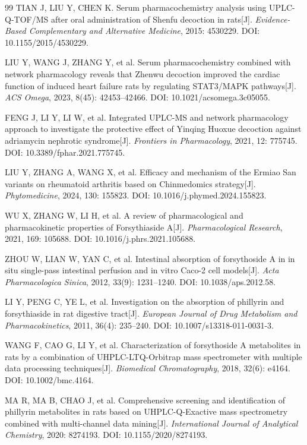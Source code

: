 \documentclass[12pt,a4paper,UTF8,scheme=chinese]{ctexart}
\begin{document}
\begin{thebibliography}{99}
TIAN J, LIU Y, CHEN K. Serum pharmacochemistry analysis using UPLC-Q-TOF/MS after oral administration of Shenfu decoction in rats[J]. \textit{Evidence-Based Complementary and Alternative Medicine}, 2015: 4530229. DOI: 10.1155/2015/4530229.

LIU Y, WANG J, ZHANG Y, et al. Serum pharmacochemistry combined with network pharmacology reveals that Zhenwu decoction improved the cardiac function of induced heart failure rats by regulating STAT3/MAPK pathways[J]. \textit{ACS Omega}, 2023, 8(45): 42453--42466. DOI: 10.1021/acsomega.3c05055.

FENG J, LI Y, LI W, et al. Integrated UPLC-MS and network pharmacology approach to investigate the protective effect of Yinqing Huoxue decoction against adriamycin nephrotic syndrome[J]. \textit{Frontiers in Pharmacology}, 2021, 12: 775745. DOI: 10.3389/fphar.2021.775745.

LIU Y, ZHANG A, WANG X, et al. Efficacy and mechanism of the Ermiao San variants on rheumatoid arthritis based on Chinmedomics strategy[J]. \textit{Phytomedicine}, 2024, 130: 155823. DOI: 10.1016/j.phymed.2024.155823.

WU X, ZHANG W, LI H, et al. A review of pharmacological and pharmacokinetic properties of Forsythiaside A[J]. \textit{Pharmacological Research}, 2021, 169: 105688. DOI: 10.1016/j.phrs.2021.105688.

ZHOU W, LIAN W, YAN C, et al. Intestinal absorption of forsythoside A in in situ single-pass intestinal perfusion and in vitro Caco-2 cell models[J]. \textit{Acta Pharmacologica Sinica}, 2012, 33(9): 1231--1240. DOI: 10.1038/aps.2012.58.

LI Y, PENG C, YE L, et al. Investigation on the absorption of phillyrin and forsythiaside in rat digestive tract[J]. \textit{European Journal of Drug Metabolism and Pharmacokinetics}, 2011, 36(4): 235--240. DOI: 10.1007/s13318-011-0031-3.

WANG F, CAO G, LI Y, et al. Characterization of forsythoside A metabolites in rats by a combination of UHPLC-LTQ-Orbitrap mass spectrometer with multiple data processing techniques[J]. \textit{Biomedical Chromatography}, 2018, 32(6): e4164. DOI: 10.1002/bmc.4164.

MA R, MA B, CHAO J, et al. Comprehensive screening and identification of phillyrin metabolites in rats based on UHPLC-Q-Exactive mass spectrometry combined with multi-channel data mining[J]. \textit{International Journal of Analytical Chemistry}, 2020: 8274193. DOI: 10.1155/2020/8274193.


\end{thebibliography}
\end{document}
